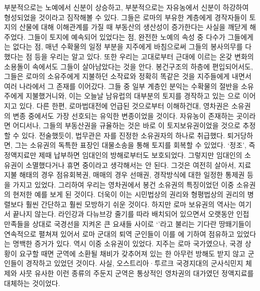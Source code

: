 부분적으로는 노예에서 신분이 상승하고,
부분적으로는 자유농에서 신분이 하강하여
형성되었을 것이라고 짐작해볼 수 있다.
그들은 로마의 부유한 계층에게
경작자들이 토지의 산물에 대해 이해관계를 가질 때
부동산의 생산성이 증가한다는 사실을
깨닫게 해주었다.
그들이 토지에 예속되어 있었다는 점,
완전한 노예의 속성 중 다수가 그들에게는 없다는 점,
매년 수확물의 일정 부분을 지주에게 바침으로써 그들의 봉사의무를
다했다는 점 등을
우리는 알고 있다.
또한 우리는 고대로부터 근대에 이르는 온갖 변화의 소용돌이 속에서도
그들이 살아남았다는 것을 안다.
봉건구조의 하층에 편입되어서도,
그들은 로마의 소유주에게 지불하던 소작료와 정확히
똑같은 것을 지주들에게 내면서 여러 나라에서 그 존재를 이어갔다.
그들 중 일부 계층인
분익는
수확물의 절반을 소유주에게 지불했거니와,
이는
오늘날 남유럽의 대부분의 토지를 경작하고 있는
 으로 이어지고 있다.
다른 한편,
로마법대전에 언급된 것으로부터 이해하건대,
영차권은
소유권의 변종 중에서도
가장 선호되는 유익한 변종이었을 것이다.
자유농이 존재하는 곳이라면 어디서나,
그들의 부동산권을 규율하는 것은 바로 이 토지보유권이었을 것으로 추정할 수 있다.
전술했듯이, 법무관은 자를
진정한 소유권자의 하나로 취급했다.
퇴거당하면, 그는
소유권의 독특한 표장인
대물소송을 통해 토지를 회복할 수 있었다.
`정조',
즉 정액지료만
제때 납부하면 임대인의 방해로부터도 보호되었다.
그렇지만 임대인의 소유권이
소멸했다거나 휴면 중이라고 생각해서는 안 된다.
그것은 여전히 살아서,
지료 지불 해태의 경우 점유회복권,
매매의 경우 선매권,
경작방식에 대한 일정한 통제권 등을 가지고 있었다.
그리하여 우리는 영차권에서
봉건 소유권의 특징이었던
이중 소유권의 현저한 예를 보게 된 것이다.
더욱이 이는
시민법상의 권리와 형평법상의 권리의 병렬보다
훨씬 간단하고 훨씬 모방하기 쉬운 것이다.
하지만 로마 보유권의 역사는 여기서 끝나지 않는다.
라인강과 다뉴브강 줄기를 따라
배치되어 있으면서
오랫동안
인접 만족들을 상대로
국경선을 지켜온
큰 요새들 사이로
`'라고 불리는
기다란 땅뙈기들이
연속적으로 펼쳐져 있어서
로마 군대의 퇴역 군인들이 이를 에 기하여
점유하고 있었다는
명백한 증거가 있다.
역시 이중 소유권이 있었다.
지주는 로마 국가였으나,
국경 상황이 요구할 때면 군역에 소환될 채비가 갖추어져 있는 한
아무런 방해도 받지 않고
군인들이
경작하고 있었던 것이다.
사실,
오스트리아^^b7투르크 국경지대의 군사식민지 체제와 사뭇 유사한
이런 종류의 주둔지 군역은
통상적인 영차권의 대가였던 정액지료를 대체하는 것이었다.
